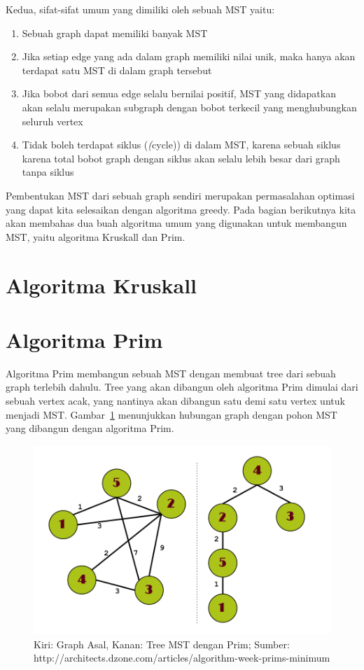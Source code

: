 Kedua, sifat-sifat umum yang dimiliki oleh sebuah MST yaitu:

\begin{enumerate}
    \item Sebuah graph dapat memiliki banyak MST
    \item Jika setiap edge yang ada dalam graph memiliki nilai unik, maka hanya akan terdapat satu MST di dalam graph tersebut
    \item Jika bobot dari semua edge selalu bernilai positif, MST yang didapatkan akan selalu merupakan subgraph dengan bobot terkecil yang menghubungkan seluruh vertex
    \item Tidak boleh terdapat siklus (\textit(cycle)) di dalam MST, karena sebuah siklus karena total bobot graph dengan siklus akan selalu lebih besar dari graph tanpa siklus
\end{enumerate}

Pembentukan MST dari sebuah graph sendiri merupakan permasalahan optimasi yang dapat kita selesaikan dengan algoritma greedy. Pada bagian berikutnya kita akan membahas dua buah algoritma umum yang digunakan untuk membangun MST, yaitu algoritma Kruskall dan Prim.

\section{Algoritma Kruskall}

\section{Algoritma Prim}

Algoritma Prim membangun sebuah MST dengan membuat tree dari sebuah graph terlebih dahulu. Tree yang akan dibangun oleh algoritma Prim dimulai dari sebuah vertex acak, yang nantinya akan dibangun satu demi satu vertex untuk menjadi MST. Gambar~\ref{fig:prims-proc} menunjukkan hubungan graph dengan pohon MST yang dibangun dengan algoritma Prim.

\begin{figure}
    \includegraphics[width=\textwidth,keepaspectratio]{fig/PrimsProc.png}%
	\caption{Kiri: Graph Asal, Kanan: Tree MST dengan Prim; Sumber: http://architects.dzone.com/articles/algorithm-week-prims-minimum}%
	\label{fig:prims-proc}%
\end{figure}

